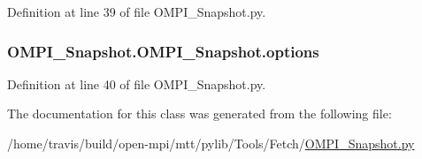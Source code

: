 Definition at line 39 of file O\-M\-P\-I\-\_\-\-Snapshot.\-py.

\hypertarget{classOMPI__Snapshot_1_1OMPI__Snapshot_a1977ca5a7120bd199d1de101a0fb8c34}{
\subsubsection[{options}]{\setlength{\rightskip}{0pt plus 5cm}O\-M\-P\-I\-\_\-\-Snapshot.\-O\-M\-P\-I\-\_\-\-Snapshot.\-options}}\label{classOMPI__Snapshot_1_1OMPI__Snapshot_a1977ca5a7120bd199d1de101a0fb8c34}


Definition at line 40 of file O\-M\-P\-I\-\_\-\-Snapshot.\-py.



The documentation for this class was generated from the following file\-:\begin{DoxyCompactItemize}
\item 
/home/travis/build/open-\/mpi/mtt/pylib/\-Tools/\-Fetch/\hyperlink{OMPI__Snapshot_8py}{O\-M\-P\-I\-\_\-\-Snapshot.\-py}\end{DoxyCompactItemize}
